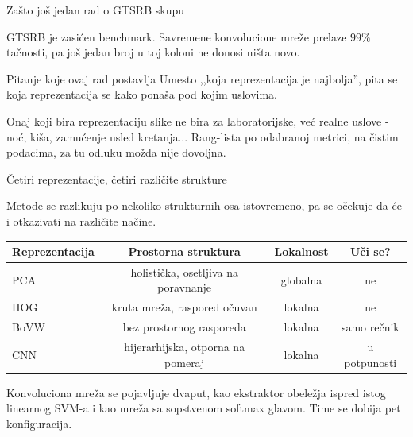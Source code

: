 \documentclass[aspectratio=169, 10pt]{beamer}
\newcommand{\uska}{\setlength{\tabcolsep}{4pt}\small}
\begin{document}
\begin{frame}{Zašto još jedan rad o GTSRB skupu}

GTSRB je \alert{zasićen benchmark}. Savremene konvolucione mreže prelaze $99\%$ tačnosti,
pa još jedan broj u toj koloni ne donosi ništa novo.

\begin{block}{Pitanje koje ovaj rad postavlja}
Umesto ,,koja reprezentacija je najbolja'', pita se \alert{koja reprezentacija se kako ponaša pod
kojim uslovima}.
\end{block}

Onaj koji bira reprezentaciju slike ne bira za laboratorijske, već realne uslove - noć, kiša, zamućenje usled kretanja...
Rang-lista po odabranoj metrici, na čistim podacima, za tu odluku možda nije dovoljna.

\end{frame}

\begin{frame}{Četiri reprezentacije, četiri različite strukture}

Metode se razlikuju po nekoliko strukturnih osa istovremeno, pa se očekuje da će i otkazivati
na različite načine.

\begin{center}
\uska
\begin{tabular}{lccc}
\toprule
\textbf{Reprezentacija} & \textbf{Prostorna struktura} & \textbf{Lokalnost} & \textbf{Uči se?} \\
\midrule
PCA  & holistička, osetljiva na poravnanje & globalna & ne \\
HOG  & kruta mreža, raspored očuvan        & lokalna  & ne \\
BoVW & \alert{bez prostornog rasporeda}    & lokalna  & samo rečnik \\
CNN  & hijerarhijska, otporna na pomeraj   & lokalna  & u potpunosti \\
\bottomrule
\end{tabular}
\end{center}

\vspace{0.3cm}
Konvoluciona mreža se pojavljuje \alert{dvaput}, kao ekstraktor obeležja ispred istog
linearnog SVM-a i kao mreža sa sopstvenom softmax glavom. Time se dobija \alert{pet
konfiguracija}.

\end{frame}
\end{document}
